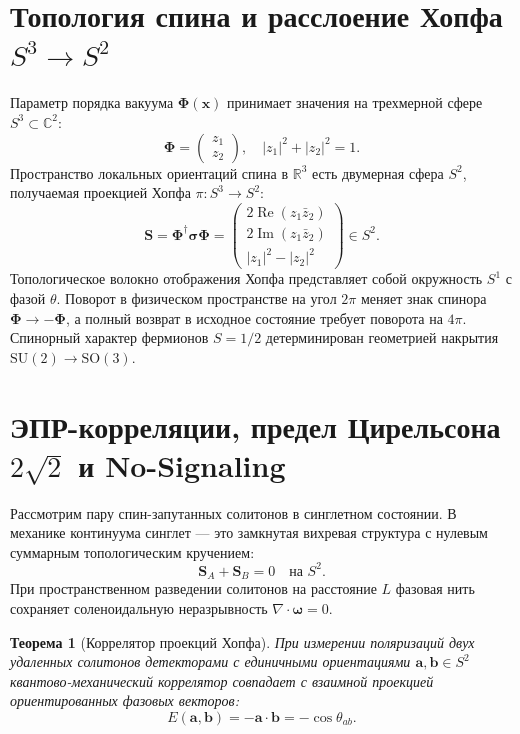 \documentclass[11pt,a4paper]{article}
\newtheorem{theorem}{Теорема}
\theoremstyle{definition}
\theoremstyle{remark}
\begin{document}
\section{Топология спина и расслоение Хопфа $S^3 \to S^2$}
Параметр порядка вакуума $\boldsymbol{\Phi}(\mathbf{x})$ принимает значения на трехмерной сфере $S^3 \subset \mathbb{C}^2$:
\begin{equation}
    \boldsymbol{\Phi} = \begin{pmatrix} z_1 \\ z_2 \end{pmatrix}, \quad |z_1|^2 + |z_2|^2 = 1.
\end{equation}
Пространство локальных ориентаций спина в $\mathbb{R}^3$ есть двумерная сфера $S^2$, получаемая проекцией Хопфа $\pi: S^3 \to S^2$:
\begin{equation}
    \mathbf{S} = \boldsymbol{\Phi}^\dagger \boldsymbol{\sigma} \boldsymbol{\Phi} = \begin{pmatrix} 2\operatorname{Re}(z_1 \bar{z}_2) \\ 2\operatorname{Im}(z_1 \bar{z}_2) \\ |z_1|^2 - |z_2|^2 \end{pmatrix} \in S^2.
\end{equation}
Топологическое волокно отображения Хопфа представляет собой окружность $S^1$ с фазой $\theta$. Поворот в физическом пространстве на угол $2\pi$ меняет знак спинора $\boldsymbol{\Phi} \to -\boldsymbol{\Phi}$, а полный возврат в исходное состояние требует поворота на $4\pi$. Спинорный характер фермионов $S=1/2$ детерминирован геометрией накрытия $\mathrm{SU}(2) \to \mathrm{SO}(3)$.

\section{ЭПР-корреляции, предел Цирельсона $2\sqrt{2}$ и No-Signaling}
Рассмотрим пару спин-запутанных солитонов в синглетном состоянии. В механике континуума синглет — это замкнутая вихревая структура с нулевым суммарным топологическим кручением:
\begin{equation}
    \mathbf{S}_A + \mathbf{S}_B = 0 \quad \text{на } S^2.
\end{equation}
При пространственном разведении солитонов на расстояние $L$ фазовая нить сохраняет соленоидальную неразрывность $\nabla \cdot \boldsymbol{\omega} = 0$.

\begin{theorem}[Коррелятор проекций Хопфа]
При измерении поляризаций двух удаленных солитонов детекторами с единичными ориентациями $\mathbf{a}, \mathbf{b} \in S^2$ квантово-механический коррелятор совпадает с взаимной проекцией ориентированных фазовых векторов:
\begin{equation}
    E(\mathbf{a}, \mathbf{b}) = -\mathbf{a} \cdot \mathbf{b} = -\cos\theta_{ab}.
\end{equation}
\end{theorem}
\end{document}
